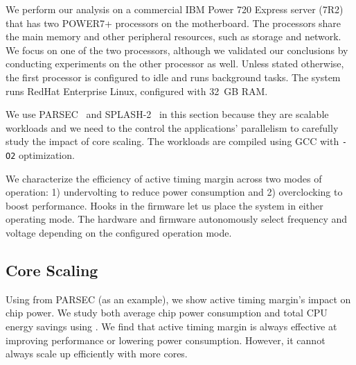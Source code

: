We perform our analysis on a commercial IBM Power 720 Express server (7R2) that has two POWER7+ processors on the motherboard. The processors share the main memory and other peripheral resources, such as storage and network. We focus on one of the two processors, although we validated our conclusions by conducting experiments on the other processor as well. Unless stated otherwise, the first processor is configured to idle and runs background tasks. The system runs RedHat Enterprise Linux, configured with 32~GB RAM. 

We use PARSEC~\cite{bienia2008parsec} and SPLASH-2~\cite{woo1995splash,bienia2008parsecsplash} in this section because they are scalable workloads and we need to the control the applications' parallelism to carefully study the impact of core scaling. The workloads are compiled using GCC with \texttt{-O2} optimization.

We characterize the efficiency of active timing margin across two modes of operation: 1) undervolting to reduce power consumption and 2) overclocking to boost performance. Hooks in the firmware let us place the system in either operating mode. The hardware and firmware autonomously select frequency and voltage depending on the configured operation mode.

\subsection{Core Scaling}
\label{sec:voltage:characterization:scaling-trends}
Using  from PARSEC (as an example), we show active timing margin's impact on chip power. We study both average chip power consumption and total CPU energy savings using . We find that active timing margin is always effective at improving performance or lowering power consumption. However, it cannot always scale up efficiently with more cores. 

